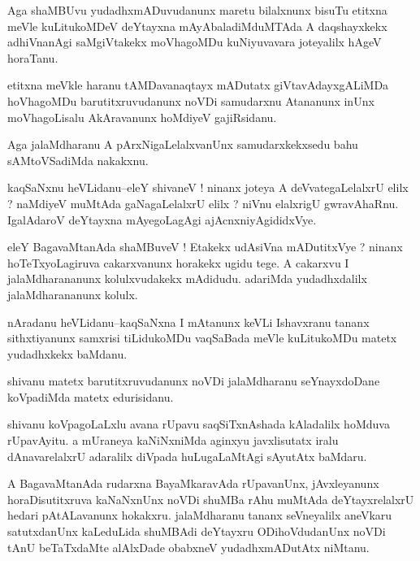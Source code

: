 \documentclass{article}
\begin{document}
\begin{mn}%
Aga shaMBUvu yudadhxmADuvudanunx maretu bilalxnunx bisuTu etitxna meVle kuLitukoMDeV 
deYtayxna mAyAbaladiMduMTAda A daqshayxkekx adhiVnanAgi saMgiVtakekx moVhagoMDu 
kuNiyuvavara joteyalilx hAgeV horaTanu.
\end{mn}

\begin{mn}%
etitxna meVkle haranu tAMDavanaqtayx mADutatx giVtavAdayxgALiMDa hoVhagoMDu 
barutitxruvudanunx noVDi samudarxnu Atananunx inUnx moVhagoLisalu AkAravanunx hoMdiyeV 
gajiRsidanu.
\end{mn}

\begin{mn}%
Aga jalaMdharanu A pArxNigaLelalxvanUnx samudarxkekxsedu bahu sAMtoVSadiMda nakakxnu.
\end{mn}

\begin{mn}%
kaqSaNxnu heVLidanu--eleY shivaneV ! ninanx joteya A deVvategaLelalxrU elilx ? naMdiyeV 
muMtAda gaNagaLelalxrU elilx ? niVnu elalxrigU gwravAhaRnu. IgalAdaroV deYtayxna 
mAyegoLagAgi ajAcnxniyAgididxVye.
\end{mn}

\begin{mn}%
eleY BagavaMtanAda shaMBuveV ! Etakekx udAsiVna mADutitxVye ? ninanx hoTeTxyoLagiruva 
cakarxvanunx horakekx ugidu tege. A cakarxvu I jalaMdharananunx kolulxvudakekx mAdidudu. 
adariMda yudadhxdalilx jalaMdharananunx kolulx.
\end{mn}

\begin{mn}%
nAradanu heVLidanu--kaqSaNxna I mAtanunx keVLi Ishavxranu tananx sithxtiyanunx samxrisi 
tiLidukoMDu vaqSaBada meVle kuLitukoMDu matetx yudadhxkekx baMdanu.
\end{mn}

\begin{mn}%
shivanu matetx barutitxruvudanunx noVDi jalaMdharanu seYnayxdoDane koVpadiMda matetx 
edurisidanu.
\end{mn}

\begin{mn}%
shivanu koVpagoLaLxlu avana rUpavu saqSiTxnAshada kAladalilx hoMduva rUpavAyitu. a mUraneya 
kaNiNxniMda aginxyu javxlisutatx iralu dAnavarelalxrU adaralilx diVpada huLugaLaMtAgi 
sAyutAtx baMdaru.
\end{mn}

\begin{mn}%
A BagavaMtanAda rudarxna BayaMkaravAda rUpavanUnx, jAvxleyanunx horaDisutitxruva kaNaNxnUnx 
noVDi shuMBa rAhu muMtAda deYtayxrelalxrU hedari pAtALavanunx hokakxru. jalaMdharanu tananx 
seVneyalilx aneVkaru satutxdanUnx kaLeduLida shuMBAdi deYtayxru ODihoVdudanUnx noVDi tAnU 
beTaTxdaMte alAlxDade obabxneV yudadhxmADutAtx niMtanu.
\end{mn}
\end{document}
